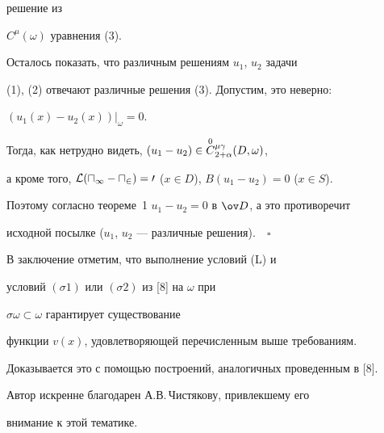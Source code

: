 решение из 


$C^\mu(\omega)$ уравнения (3). 


 


Осталось показать, что различным решениям $u_1$, $u_2$ задачи 


(1), (2) отвечают различные решения (3). Допустим, это неверно: 


$(u_1(x)-u_2(x))\big|_\omega=0$. 


Тогда, как нетрудно видеть, $(u_1-u_2)\in 


\oC^{\mu\gamma}_{2+\alpha}(D,\omega)$, 


а кроме того, $\cal L(u_1-u_2)=0$ ($x\in D$), $B(u_1-u_2)=0$ ($x\in 


S$). 


Поэтому согласно теореме~1\; $u_1-u_2=0$ в $\ov D$, а это противоречит 


исходной посылке ($u_1$, $u_2$ --- различные решения).$\quad\square$


\medskip 


 


В заключение отметим, что выполнение условий (L) и 


условий $(\sigma1)$ или $(\sigma2)$ из [8] на $\omega$ при 


$\sigma\omega\subset\omega$ гарантирует существование 


функции $v(x)$, удовлетворяющей перечисленным выше требованиям. 


Доказывается это с помощью построений, аналогичных проведенным в [8]. 


 


Автор искренне благодарен А.В.\,Чистякову, привлекшему его 


внимание к этой тематике. 


 


